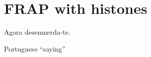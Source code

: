 \chapter{FRAP with histones}
\label{ch:frap}

  \epigraph{Agora desenmerda-te.}{Portuguese ``saying''}



  \noindent

  
  
  
  

